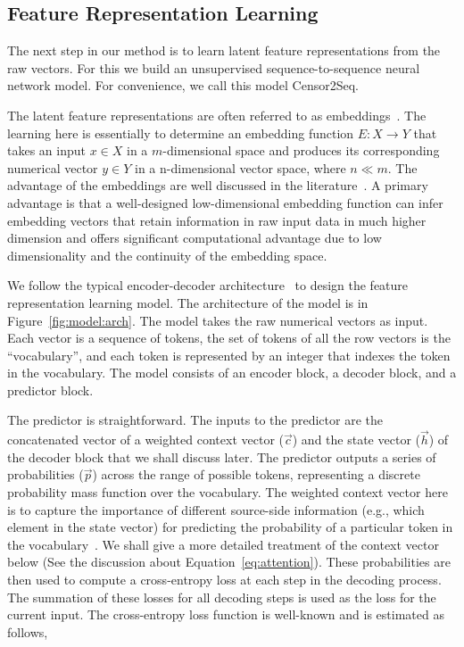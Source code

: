 \subsection{Feature Representation Learning}
\label{sec:design:fl}
The next step in our method is to learn latent feature representations from the raw vectors.
For this we build an unsupervised
sequence-to-sequence neural network model. For convenience, we call this model
Censor2Seq.  


The latent feature representations are often
referred to as embeddings~\cite{sarabi_characterizing_2018}. The learning here
is essentially to determine an embedding function $E : X \rightarrow Y$ that
takes an input $x \in X$ in a $m$-dimensional space and produces its
corresponding numerical vector $y \in Y$ in a n-dimensional vector space, where
$n \ll m$. The advantage of the embeddings are well discussed in the
literature~\cite{sarabi_characterizing_2018}. A primary advantage is that a
well-designed low-dimensional embedding function can infer embedding vectors
that retain information in raw input data in much higher dimension and offers
significant computational advantage due to low dimensionality and the 
continuity of the embedding space. 

We follow the typical encoder-decoder
architecture~\cite{sarabi_characterizing_2018, rezende2014stochastic} to design
the feature representation learning model. The architecture of the model is in
Figure~\ref{fig:model:arch}. 
The model takes the raw numerical
vectors as input. Each vector is a sequence of tokens, 
the set of tokens of all the row vectors is the ``vocabulary'', and each token is represented by an
integer that indexes the token in the vocabulary. The model consists of an
encoder block, a decoder block, and a predictor block. 

The predictor is straightforward. The inputs to the predictor are the
concatenated vector of a weighted context vector ($\vec{c}$) and the state
vector ($\vec{h}$) of the decoder block that we shall discuss later. 
The predictor outputs a series of probabilities ($\vec{p}$)
across the range of possible tokens, representing a discrete probability mass
function over the vocabulary. 
The weighted context vector here is to capture
the importance of different source-side information (e.g., which element in the state
vector) for predicting the probability of a particular token in the vocabulary~\cite{luong2015effective}.
We shall give a more detailed treatment of the context vector below (See the discussion about Equation~\eqref{eq:attention}). 
These probabilities are then used to compute a
cross-entropy loss at each step in the decoding process. The summation of
these losses for all decoding steps is used as the loss for the current input. 
The cross-entropy loss function is well-known and is estimated as follows, 

